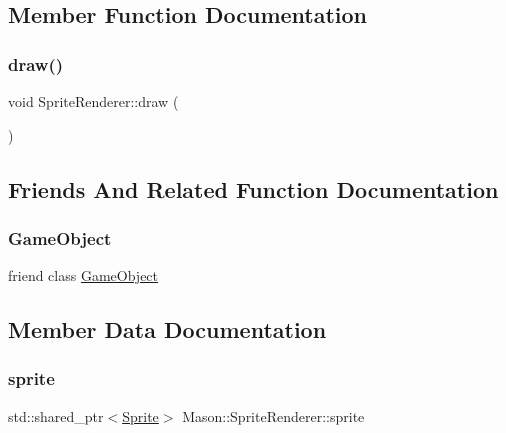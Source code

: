 \subsection{Member Function Documentation}
\hypertarget{class_mason_1_1_sprite_renderer_aeeeaa7eb5c340b7c2abad3d4785fd1e1}{}\label{class_mason_1_1_sprite_renderer_aeeeaa7eb5c340b7c2abad3d4785fd1e1} 
\subsubsection{\texorpdfstring{draw()}{draw()}}
{\footnotesize\ttfamily void Sprite\+Renderer\+::draw (\begin{DoxyParamCaption}{ }\end{DoxyParamCaption})}



\subsection{Friends And Related Function Documentation}
\hypertarget{class_mason_1_1_sprite_renderer_a00df87c957d8f7ee0fc51f07a0542f4a}{}\label{class_mason_1_1_sprite_renderer_a00df87c957d8f7ee0fc51f07a0542f4a} 
\subsubsection{\texorpdfstring{Game\+Object}{GameObject}}
{\footnotesize\ttfamily friend class \hyperlink{class_mason_1_1_game_object}{Game\+Object}\hspace{0.3cm}{\ttfamily [friend]}}



\subsection{Member Data Documentation}
\hypertarget{class_mason_1_1_sprite_renderer_a17a9d82d45d7ae1058542e5c939122c6}{}\label{class_mason_1_1_sprite_renderer_a17a9d82d45d7ae1058542e5c939122c6} 
\subsubsection{\texorpdfstring{sprite}{sprite}}
{\footnotesize\ttfamily std\+::shared\+\_\+ptr$<$\hyperlink{class_mason_1_1_sprite}{Sprite}$>$ Mason\+::\+Sprite\+Renderer\+::sprite}



